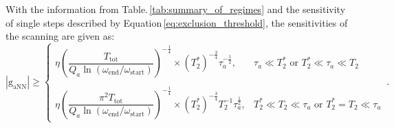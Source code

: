 
With the information from Table.\,\ref{tab:summary_of_regimes} and the sensitivity of single steps described by Equation\,\eqref{eq:exclusion_threshold}, the sensitivities of the scanning are given as:
\begin{equation}
    |\mathrm{g_{aNN}}| \geqslant \left\{
    \begin{array}{ll}
    \eta
    \left(\dfrac{T_{\mathrm{tot}}}{Q_a\ln{ \left(\omega_{\mathrm{end}}/\omega_{\mathrm{start}} \right) } }\right)^{-\frac{1}{4}}   
     \times  (T_2^*)^{-\frac{3}{4}} \tau_a^{-\frac{1}{2}},
    & \tau_a\ll T_2^* \text{ or }  T_2^*\ll\tau_a\ll T_2 \\
    & \\
    \eta
    \left(\dfrac{\pi^2 T_{\mathrm{tot}}}{Q_a\ln{ \left(\omega_{\mathrm{end}}/\omega_{\mathrm{start}} \right) } }\right)^{-\frac{1}{4}}  
     \times  (T_2^*)^{-\frac{3}{4}} T_2^{-1} \tau_a^{\frac{1}{2}},
    & T_2^* \ll T_2 \ll \tau_a \text{ or } T_2^*=T_2 \ll \tau_a  %
    \end{array} \right.
    \,.\label{eq:gaNN_Ttot_optimal}
\end{equation}

